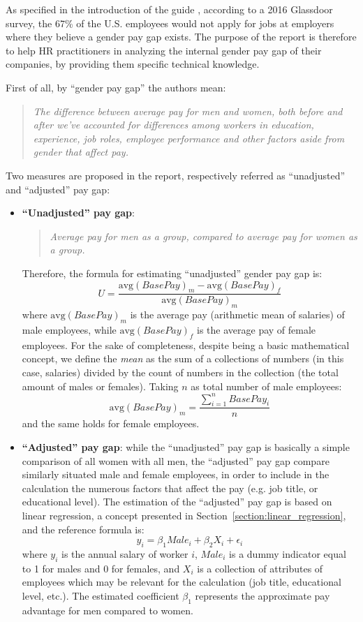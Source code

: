 As specified in the introduction of the guide \cite[p.~2]{chamberlain2017analyze}, according to a 2016 Glassdoor survey, the 67\% of the U.S. employees would not apply for jobs at employers where they believe a gender pay gap exists. The purpose of the report is therefore to help HR practitioners in analyzing the internal gender pay gap of their companies, by providing them specific technical knowledge.

First of all, by ``gender pay gap'' the authors mean:
\begin{quote}\emph{The difference between average pay for men and women, both before and after we've accounted for differences among workers in education, experience, job roles, employee performance and other factors aside from gender that affect pay.} \cite[p.~3]{chamberlain2017analyze}\end{quote}
Two measures are proposed in the report, respectively referred as ``unadjusted'' and ``adjusted'' pay gap:
\begin{itemize}
\item \textbf{``Unadjusted'' pay gap}:
\begin{quote}\emph{Average pay for men as a group, compared to average pay for women as a group.} \cite[p.~3]{chamberlain2017analyze}\end{quote}
Therefore, the formula for estimating ``unadjusted'' gender pay gap is: \[U = \frac{\mathrm{avg}(BasePay)_m - \mathrm{avg}(BasePay)_f}{\mathrm{avg}(BasePay)_m}\] where \(\mathrm{avg}(BasePay)_m\) is the average pay (arithmetic mean of salaries) of male employees, while \(\mathrm{avg}(BasePay)_f\) is the average pay of female employees.
For the sake of completeness, despite being a basic mathematical concept, we define the \textit{mean} as the sum of a collections of numbers (in this case, salaries) divided by the count of numbers in the collection (the total amount of males or females). Taking \(n\) as total number of male employees: \[\mathrm{avg}(BasePay)_m = \frac{\sum\limits_{i=1}^n BasePay_i}{n}\] and the same holds for female employees.
\item \textbf{``Adjusted'' pay gap}: while the ``unadjusted'' pay gap is basically a simple comparison of all women with all men, the ``adjusted'' pay gap compare similarly situated male and female employees, in order to include in the calculation the numerous factors that affect the pay (e.g. job title, or educational level). The estimation of the ``adjusted'' pay gap is based on linear regression, a concept presented in Section~\ref{section:linear_regression}, and the reference formula is: \[y_i = \beta_1\textit{Male}_i + \beta_2X_i + \epsilon_i\] where \(y_i\) is the annual salary of worker \(i\), \(\textit{Male}_i\) is a dummy indicator equal to 1 for males and 0 for females, and \(X_i\) is a collection of attributes of employees which may be relevant for the calculation (job title, educational level, etc.). The estimated coefficient \(\beta_1\) represents the approximate pay advantage for men compared to women.
\end{itemize}


